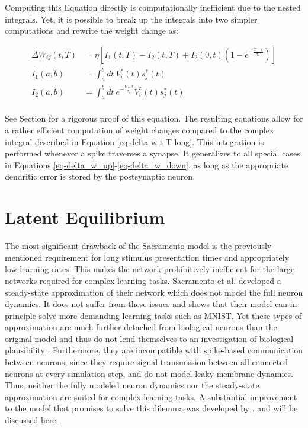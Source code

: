 Computing this Equation directly is computationally inefficient due to the nested integrals. Yet, it is possible to
break up the integrals into two simpler computations and rewrite the weight change as:


\begin{align}
  \Delta W_{ij}(t, T) & = \eta \left[ I_1 (t, T) - I_2(t,T) + I_2(0,t)\left( 1- e^{-\frac{T-t}{\tau_\kappa}} \right) \right] \\
  I_1(a, b)           & = \int_{a}^{b} dt \ V_i^\ast (t) s_j^\ast (t)                                                        \\
  I_2(a, b)           & = \int_{a}^{b} dt \ e^{-\frac{b-t}{\tau_\kappa}} V_i^\ast (t) s_j^\ast (t)                           \\
\end{align}

See Section  for a rigorous proof of this equation. The resulting equations allow for a rather efficient
computation of weight changes compared to the complex integral described in Equation \ref{eq-delta-w-t-T-long}. This
integration is performed whenever a spike traverses a synapse. It generalizes to all special cases in Equations
\ref{eq-delta_w_up}-\ref{eq-delta_w_down}, as long as the appropriate dendritic error is stored by the postsynaptic
neuron.

\section{Latent Equilibrium}\label{sec-haider}

The most significant drawback of the Sacramento model is the previously mentioned requirement for long stimulus
presentation times and appropriately low learning rates. This makes the network prohibitively inefficient for the large
networks required for complex learning tasks. Sacramento et al. developed a steady-state approximation of their network
which does not model the full neuron dynamics. It does not suffer from these issues and shows that their model can in
principle solve more demanding learning tasks such as MNIST. Yet these types of approximation are much further detached
from biological neurons than the original model and thus do not lend themselves to an investigation of biological
plausibility \citep{Gerstner2009}. Furthermore, they are incompatible with spike-based communication between neurons,
since they require signal transmission between all connected neurons at every simulation step, and do not model leaky
membrane dynamics. Thus, neither the fully modeled neuron dynamics nor the steady-state approximation are suited for
complex learning tasks. A substantial improvement to the model that promises to solve this dilemma was developed by
\cite{Haider2021}, and will be discussed here.
\newline

